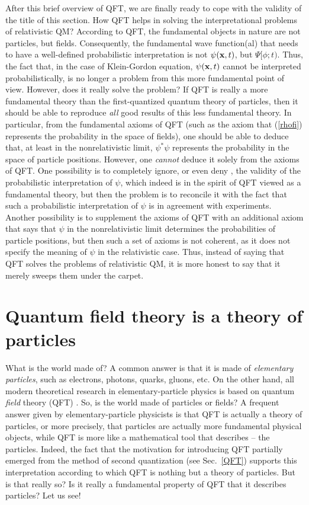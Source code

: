 \documentclass[12pt]{article}
\begin{document}
After this brief overview of QFT, we are finally ready 
to cope with the validity of the title of this section. 
How QFT helps in solving the interpretational problems 
of relativistic QM? According to QFT, the fundamental 
objects in nature are not particles, but fields.
Consequently, the fundamental wave function(al) that
needs to have a well-defined probabilistic interpretation 
is not $\psi({\bf x},t)$, but $\Psi[\phi;t)$. 
Thus, the fact that, in the case of Klein-Gordon equation,
$\psi({\bf x},t)$ cannot be interpreted 
probabilistically, is no longer a problem from this more 
fundamental point of view. However, does it really solve 
the problem? If QFT is really a more fundamental 
theory than the first-quantized quantum theory of 
particles, then it should be able to reproduce {\em all}
good results of this less fundamental theory. 
In particular, from the fundamental 
axioms of QFT (such as the axiom that (\ref{rhofi}) represents 
the probability in the space of fields), one should be able to deduce 
that, at least in the nonrelativistic limit, $\psi^*\psi$ represents 
the probability in the space of particle positions. 
However, one {\em cannot} deduce it solely from the axioms of 
QFT. One possibility is to 
completely ignore, or even deny \cite{zeh}, the validity of the 
probabilistic interpretation of 
$\psi$, which indeed is in the spirit of QFT viewed as a fundamental 
theory, but then the problem is to reconcile it with the 
fact that such a probabilistic interpretation of $\psi$
is in agreement with experiments. Another possibility 
is to supplement the axioms of QFT with an additional 
axiom that says that $\psi$ in the nonrelativistic limit 
determines the probabilities of particle positions, 
but then such a set of axioms is not coherent, as it does not 
specify the meaning of $\psi$ in the relativistic case.
Thus, instead of saying that QFT solves the problems of 
relativistic QM, it is more honest to say that it merely sweeps 
them under the carpet.            
 
\section{Quantum field theory is a theory of particles}
\label{QFTP}

What is the world made of? A common answer is that it is made 
of {\em elementary particles}, such as electrons, photons, quarks, 
gluons, etc. On the other hand, all modern theoretical 
research in elementary-particle physics is based on 
quantum {\em field} theory (QFT) \cite{BD2,ryder,cheng}. 
So, is the world made of 
particles or fields? A frequent answer given by 
elementary-particle physicists is that QFT is actually
a theory of particles, or more precisely, that particles are actually more 
fundamental physical objects, while QFT is more like a mathematical tool 
that describes -- the particles. Indeed, the fact that the motivation 
for introducing QFT partially emerged from the method of second
quantization (see Sec.~\ref{QFT}) supports this interpretation 
according to which QFT is nothing but a theory of particles. 
But is that really so?
Is it really a fundamental property of QFT that it describes particles?
Let us see! 
\end{document}

